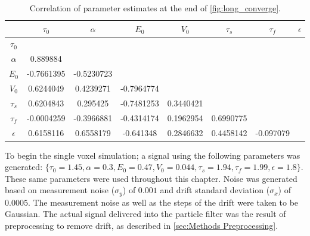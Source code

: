 \begin{table}[t]
\begin{tabular}{|c | c  c  c  c  c  c  c |}
\hline
  & $\tau_0$ & $\alpha$ & $E_0$    & $V_0$    & $\tau_s$ & $\tau_f$ & $\epsilon$ \\
\hline
\rowcolor[gray]{.8} $\tau_0$  & & & & & & & \\
$\alpha$                      & 0.889884 & & & & & & \\
\rowcolor[gray]{.8} $E_0$     & -0.7661395 & -0.5230723 & & & & & \\
$V_0$                         & 0.6244049 & 0.4239271 & -0.7964774 & & & & \\
\rowcolor[gray]{.8} $\tau_s$  & 0.6204843 & 0.295425 & -0.7481253 & 0.3440421 & & & \\
$\tau_f$                      & -0.0004259 & -0.3966881 & -0.4314174 & 0.1962954 & 0.6990775 & & \\
\rowcolor[gray]{.8} $\epsilon$& 0.6158116 & 0.6558179 & -0.641348 & 0.2846632 & 0.4458142 & -0.097079 & \\
\hline
\end{tabular}
\caption{Correlation of parameter estimates at the end of \autoref{fig:long_converge}.}
\label{tab:long_corr}
\end{table}

To begin the single voxel simulation; a signal using the following parameters
was generated:
$\{\tau_0 = 1.45, \alpha = 0.3, E_0 = 0.47, V_0 = 0.044, \tau_s = 1.94, \tau_f = 1.99, \epsilon = 1.8\}$.
These same parameters were used throughout this chapter. Noise
was generated based on measurement noise ($\sigma_y$) of $0.001$ and drift standard deviation
($\sigma_x$) of $0.0005$. The measurement noise as well as the steps of the drift
were taken to be Gaussian. The actual signal delivered into the particle filter
was the result of preprocessing to remove drift, as described in
\autoref{sec:Methods Preprocessing}.

